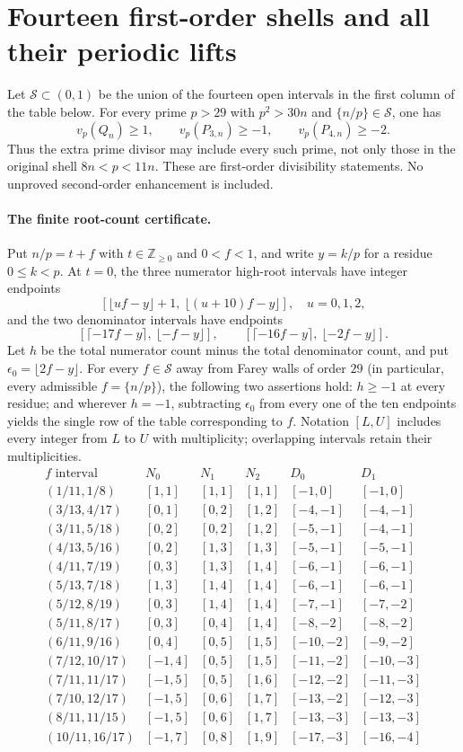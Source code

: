 \section{Fourteen first-order shells and all their periodic lifts}
Let $\mathcal S\subset(0,1)$ be the union of the fourteen open intervals
in the first column of the table below.  For every prime $p>29$ with
$p^2>30n$ and $\{n/p\}\in\mathcal S$, one has
\[
 v_p(Q_n)\ge1,\qquad v_p(P_{3,n})\ge-1,\qquad
 v_p(P_{4,n})\ge-2.                                    \tag{PS}
\]
Thus the extra prime divisor may include every such prime, not only those
in the original shell $8n<p<11n$.  These are first-order divisibility
statements.  No unproved second-order enhancement is included.

\paragraph{The finite root-count certificate.}
Put $n/p=t+f$ with $t\in\mathbb Z_{\ge0}$ and $0<f<1$, and write
$y=k/p$ for a residue $0\le k<p$.  At $t=0$, the three numerator high-root
intervals have integer endpoints
\[
 [\lfloor uf-y\rfloor+1,\ \lfloor(u+10)f-y\rfloor],\quad u=0,1,2,
\]
and the two denominator intervals have endpoints
\[
 [\lceil-17f-y\rceil,\ \lfloor-f-y\rfloor],\qquad
 [\lceil-16f-y\rceil,\ \lfloor-2f-y\rfloor].
\]
Let $h$ be the total numerator count minus the total denominator count,
and put $\epsilon_0=\lfloor2f-y\rfloor$.
For every $f\in\mathcal S$ away from Farey walls of order $29$ (in particular, every admissible $f=\{n/p\}$), the following two assertions hold:
$h\ge-1$ at every residue; and wherever $h=-1$, subtracting $\epsilon_0$
from every one of the ten endpoints yields the single row of the table
corresponding to $f$.  Notation $[L,U]$ includes every integer from $L$ to
$U$ with multiplicity; overlapping intervals retain their multiplicities.
\[
\begin{array}{c|ccc|cc}
 f\text{ interval}&N_0&N_1&N_2&D_0&D_1\\\hline
 (1/11,1/8)&[1,1]&[1,1]&[1,1]&[-1,0]&[-1,0]\\
 (3/13,4/17)&[0,1]&[0,2]&[1,2]&[-4,-1]&[-4,-1]\\
 (3/11,5/18)&[0,2]&[0,2]&[1,2]&[-5,-1]&[-4,-1]\\
 (4/13,5/16)&[0,2]&[1,3]&[1,3]&[-5,-1]&[-5,-1]\\
 (4/11,7/19)&[0,3]&[1,3]&[1,4]&[-6,-1]&[-6,-1]\\
 (5/13,7/18)&[1,3]&[1,4]&[1,4]&[-6,-1]&[-6,-1]\\
 (5/12,8/19)&[0,3]&[1,4]&[1,4]&[-7,-1]&[-7,-2]\\
 (5/11,8/17)&[0,3]&[0,4]&[1,4]&[-8,-2]&[-8,-2]\\
 (6/11,9/16)&[0,4]&[0,5]&[1,5]&[-10,-2]&[-9,-2]\\
 (7/12,10/17)&[-1,4]&[0,5]&[1,5]&[-11,-2]&[-10,-3]\\
 (7/11,11/17)&[-1,5]&[0,5]&[1,6]&[-12,-2]&[-11,-3]\\
 (7/10,12/17)&[-1,5]&[0,6]&[1,7]&[-13,-2]&[-12,-3]\\
 (8/11,11/15)&[-1,5]&[0,6]&[1,7]&[-13,-3]&[-13,-3]\\
 (10/11,16/17)&[-1,7]&[0,8]&[1,9]&[-17,-3]&[-16,-4]
\end{array}
\]

